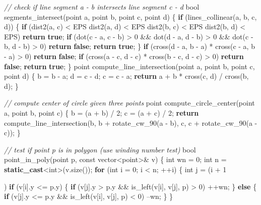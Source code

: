 \documentclass[10pt,]{article}
\newenvironment{Shaded}{}{}
\newcommand{\KeywordTok}[1]{\textcolor[rgb]{0.00,0.44,0.13}{\textbf{{#1}}}}
\newcommand{\DataTypeTok}[1]{\textcolor[rgb]{0.56,0.13,0.00}{{#1}}}
\newcommand{\DecValTok}[1]{\textcolor[rgb]{0.25,0.63,0.44}{{#1}}}
\newcommand{\CommentTok}[1]{\textcolor[rgb]{0.38,0.63,0.69}{\textit{{#1}}}}
\newcommand{\NormalTok}[1]{{#1}}
\begin{document}
\begin{Shaded}
\begin{Highlighting}[]
\CommentTok{// check if line segment a - b intersects line segment c - d}
\DataTypeTok{bool} \NormalTok{segments_intersect(point a, point b, point c, point d) \{}
    \KeywordTok{if} \NormalTok{(lines_collinear(a, b, c, d)) \{}
        \KeywordTok{if} \NormalTok{(dist2(a, c) < EPS \textbar{}\textbar{} dist2(a, d) < EPS \textbar{}\textbar{}}
                \NormalTok{dist2(b, c) < EPS \textbar{}\textbar{} dist2(b, d) < EPS) }\KeywordTok{return} \KeywordTok{true}\NormalTok{;}
        \KeywordTok{if} \NormalTok{(dot(c - a, c - b) > }\DecValTok{0} \NormalTok{&& dot(d - a, d - b) > }\DecValTok{0} \NormalTok{&&}
                \NormalTok{dot(c - b, d - b) > }\DecValTok{0}\NormalTok{) }\KeywordTok{return} \KeywordTok{false}\NormalTok{;}
        \KeywordTok{return} \KeywordTok{true}\NormalTok{;}
    \NormalTok{\}}
    \KeywordTok{if} \NormalTok{(cross(d - a, b - a) * cross(c - a, b - a) > }\DecValTok{0}\NormalTok{) }\KeywordTok{return} \KeywordTok{false}\NormalTok{;}
    \KeywordTok{if} \NormalTok{(cross(a - c, d - c) * cross(b - c, d - c) > }\DecValTok{0}\NormalTok{) }\KeywordTok{return} \KeywordTok{false}\NormalTok{;}
    \KeywordTok{return} \KeywordTok{true}\NormalTok{;}
\NormalTok{\}}
\NormalTok{point compute_line_intersection(point a, point b, point c, point d) \{}
    \NormalTok{b = b - a; d = c - d; c = c - a;}
    \KeywordTok{return} \NormalTok{a + b * cross(c, d) / cross(b, d);}
\NormalTok{\}}

\CommentTok{// compute center of circle given three points}
\NormalTok{point compute_circle_center(point a, point b, point c) \{}
    \NormalTok{b = (a + b) / }\DecValTok{2}\NormalTok{;}
    \NormalTok{c = (a + c) / }\DecValTok{2}\NormalTok{;}
    \KeywordTok{return} \NormalTok{compute_line_intersection(b, b + rotate_cw_90(a - b),}
            \NormalTok{c, c + rotate_cw_90(a - c));}
\NormalTok{\}}

\CommentTok{// test if point p is in polygon (use winding number test)}
\DataTypeTok{bool} \NormalTok{point_in_poly(point p, }\DataTypeTok{const} \NormalTok{vector<point>& v) \{}
    \DataTypeTok{int} \NormalTok{wn = }\DecValTok{0}\NormalTok{;}
    \DataTypeTok{int} \NormalTok{n = }\KeywordTok{static_cast}\NormalTok{<}\DataTypeTok{int}\NormalTok{>(v.size());}
    \KeywordTok{for} \NormalTok{(}\DataTypeTok{int} \NormalTok{i = }\DecValTok{0}\NormalTok{; i < n; ++i) \{}
        \DataTypeTok{int} \NormalTok{j = (i + }\DecValTok{1}\NormalTok{) % n;}
        \KeywordTok{if} \NormalTok{(v[i].y <= p.y) \{}
            \KeywordTok{if} \NormalTok{(v[j].y > p.y && is_left(v[i], v[j], p) > }\DecValTok{0}\NormalTok{)}
                \NormalTok{++wn;}
        \NormalTok{\} }\KeywordTok{else} \NormalTok{\{}
            \KeywordTok{if} \NormalTok{(v[j].y <= p.y && is_left(v[i], v[j], p) < }\DecValTok{0}\NormalTok{)}
                \NormalTok{--wn;}
        \NormalTok{\}}
    \NormalTok{\}}

}
\end{Highlighting}
\end{Shaded}
\end{document}
